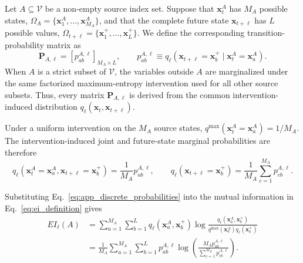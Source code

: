 \documentclass[fleqn,10pt]{wlscirep}
\begin{document}
Let \(A\subseteq\mathcal{V}\) be a non-empty source index set. Suppose that
\(\boldsymbol{x}_{t}^{A}\) has \(M_A\) possible states,
\(\Omega_A=\{\boldsymbol{x}_1^{A},\ldots,\boldsymbol{x}_{M_A}^{A}\}\), and
that the complete future state \(\boldsymbol{x}_{t+\ell}\) has \(L\) possible
values,
\(\Omega_{t+\ell}
=\{\boldsymbol{x}_1^{+},\ldots,\boldsymbol{x}_{L}^{+}\}\).
We define the corresponding transition-probability matrix as
\begin{equation}
    \mathbf{P}_{A,\ell}
    =
    \left[
        p_{ab}^{A,\ell}
    \right]_{M_A\times L},
    \qquad
    p_{ab}^{A,\ell}
    \equiv
    q_{\ell}
    \left(
        \boldsymbol{x}_{t+\ell}=\boldsymbol{x}_b^{+}
        \mid
        \boldsymbol{x}_{t}^{A}=\boldsymbol{x}_a^{A}
    \right).
    \label{eq:app_transition_matrix}
\end{equation}
When \(A\) is a strict subset of \(\mathcal{V}\), the variables outside \(A\)
are marginalized under the same factorized maximum-entropy intervention used
for all other source subsets. Thus, every matrix \(\mathbf{P}_{A,\ell}\) is
derived from the common intervention-induced distribution
\(q_{\ell}(\boldsymbol{x}_{t},\boldsymbol{x}_{t+\ell})\).

Under a uniform intervention on the \(M_A\) source states,
\(q^{\max}(\boldsymbol{x}_{t}^{A}=\boldsymbol{x}_a^{A})=1/M_A\).
The intervention-induced joint and future-state marginal probabilities are
therefore
\begin{equation}
    q_{\ell}
    \left(
        \boldsymbol{x}_{t}^{A}=\boldsymbol{x}_a^{A},
        \boldsymbol{x}_{t+\ell}=\boldsymbol{x}_b^{+}
    \right)
    =
    \frac{1}{M_A}p_{ab}^{A,\ell},
    \qquad
    q_{\ell}
    \left(
        \boldsymbol{x}_{t+\ell}=\boldsymbol{x}_b^{+}
    \right)
    =
    \frac{1}{M_A}
    \sum_{c=1}^{M_A}p_{cb}^{A,\ell}.
    \label{eq:app_discrete_probabilities}
\end{equation}

Substituting Eq.~\eqref{eq:app_discrete_probabilities} into the mutual
information in Eq.~\eqref{eq:ei_definition} gives
\begin{align}
    EI_{\ell}(A)
    &=
    \sum_{a=1}^{M_A}
    \sum_{b=1}^{L}
    q_{\ell}
    \left(
        \boldsymbol{x}_a^{A},
        \boldsymbol{x}_b^{+}
    \right)
    \log
    \frac{
        q_{\ell}
        \left(
            \boldsymbol{x}_a^{A},
            \boldsymbol{x}_b^{+}
        \right)
    }{
        q^{\max}(\boldsymbol{x}_a^{A})
        q_{\ell}(\boldsymbol{x}_b^{+})
    }
    \nonumber\\
    &=
    \frac{1}{M_A}
    \sum_{a=1}^{M_A}
    \sum_{b=1}^{L}
    p_{ab}^{A,\ell}
    \log
    \left(
        \frac{
            M_Ap_{ab}^{A,\ell}
        }{
            \sum_{c=1}^{M_A}p_{cb}^{A,\ell}
        }
    \right).
    \label{eq:app_discrete_ei}
\end{align}
\end{document}
